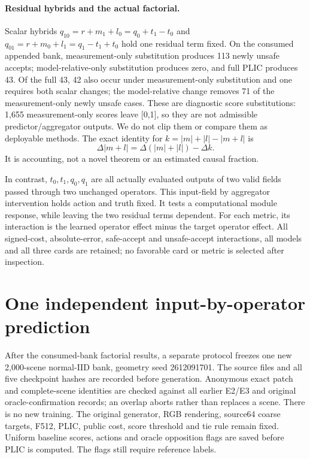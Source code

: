 \paragraph{Residual hybrids and the actual factorial.}
Scalar hybrids $q_{10}=r+m_1+l_0=q_0+t_1-t_0$ and
$q_{01}=r+m_0+l_1=q_1-t_1+t_0$ hold one residual term fixed. On the consumed
appended bank, measurement-only substitution produces 113 newly unsafe accepts;
model-relative-only substitution produces zero, and full PLIC produces 43.
Of the full 43, 42 also occur under measurement-only substitution and one
requires both scalar changes; the model-relative change removes 71 of the
measurement-only newly unsafe cases. These are diagnostic score substitutions:
1,655 measurement-only scores leave [0,1], so they are not admissible
predictor/aggregator outputs. We do not clip them or compare them as deployable
methods. The exact identity for $k=|m|+|l|-|m+l|$ is
\[
\Delta |m+l|=\Delta(|m|+|l|)-\Delta k.
\]
It is accounting, not a novel theorem or an estimated causal fraction.

In contrast, $t_0,t_1,q_0,q_1$ are all actually evaluated outputs of two valid
fields passed through two unchanged operators. This input-field by aggregator
intervention holds action and truth fixed. It tests a computational module
response, while leaving the two residual terms dependent. For each metric,
its interaction is the learned operator effect minus the target operator effect.
All signed-cost, absolute-error, safe-accept and unsafe-accept interactions,
all models and all three cards are retained; no favorable card or metric is
selected after inspection.

\section{One independent input-by-operator prediction}
\label{app:interactionconfirmation}
After the consumed-bank factorial results, a separate protocol freezes one new
2,000-scene normal-IID bank, geometry seed 2612091701. The source files and all
five checkpoint hashes are recorded before generation. Anonymous exact patch
and complete-scene identities are checked against all earlier E2/E3 and original
oracle-confirmation records; an overlap aborts rather than replaces a scene.
There is no new training. The original generator, RGB rendering, source64
coarse targets, F512, PLIC, public cost, score threshold and tie rule remain fixed.
Uniform baseline scores, actions and oracle opposition flags are saved before
PLIC is computed. The flags still require reference labels.

